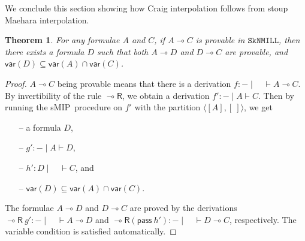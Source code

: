 \documentclass[sn-mathphys-num]{sn-jnl}%
\newcommand{\vd}{\vdash}
\newcommand{\pass}{\mathsf{pass}}
\newcommand{\lolli}{\multimap}
\newcommand{\lright}{{\lolli}\mathsf{R}}
\newcommand{\SkNMILL}{$\mathtt{SkNMILL}$}
\newcommand{\mf}[1]{\mathsf{#1}}
\newcommand{\gs}[1]{\sigma_{X} (#1)}
\newcommand{\vars}[1]{\mf{var} (#1)}
\newcommand{\sMIP}{\textsf{sMIP}}
\theoremstyle{thmstyleone}%
\newtheorem{theorem}{Theorem}%
\theoremstyle{thmstyletwo}%
\newtheorem{lemma}[theorem]{Lemma}
\theoremstyle{thmstylethree}%
\begin{document}
We conclude this section showing how Craig interpolation follows from stoup Maehara interpolation.
\begin{theorem}\label{thm:craig:intrp}
  For any formulae $A$ and $C$, if $A \lolli C$ is provable in \SkNMILL, then there exists a formula $D$ such that both $A \lolli D$ and $D \lolli C$ are provable, and $\vars{D} \subseteq \vars{A} \cap \vars{C}$.
\end{theorem}
\begin{proof}
$A \lolli C$ being provable means that there is a derivation $f : {-} \mid \quad \vd A \lolli C$. 
  By invertibility of the rule $\lright$, we obtain a derivation $f' : {-} \mid A \vd C$.
  Then by running the \sMIP~procedure on $f'$ with the partition $\langle [A ], [\ ]\rangle$, we get  
  \begin{itemize}
    \item[--]  a formula $D$,
    \item[--] $g': {-} \mid A \vd D$,
    \item[--] $h': D \mid \quad \vd C$, and 
    \item[--] $\vars{D} \subseteq \vars{A} \cap \vars{C}$.
  \end{itemize}
  The formulae $A \lolli D$ and $D \lolli C$ are proved by the derivations $\lright \ g' : {-} \mid \quad \vd A \lolli D$ and $\lright (\pass \ h') : {-} \mid \quad \vd D \lolli C$, respectively.
  The variable condition is satisfied automatically.
\end{proof}
\end{document}
